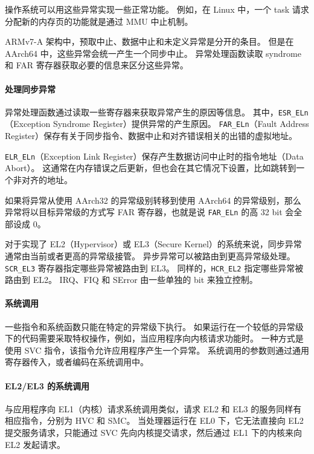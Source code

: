操作系统可以用这些异常实现一些正常功能。
例如，在 Linux 中，一个 task 请求分配新的内存页的功能就是通过 MMU 中止机制。

ARMv7-A 架构中，预取中止、数据中止和未定义异常是分开的条目。
但是在 AArch64 中，这些异常会统一产生一个同步中止。
异常处理函数读取 syndrome 和 FAR 寄存器获取必要的信息来区分这些异常。

\paragraph*{处理同步异常}

异常处理函数通过读取一些寄存器来获取异常产生的原因等信息。
其中，\lstinline!ESR_ELn!（Exception Syndrome Register）提供异常的产生原因。
\lstinline!FAR_ELn!（Fault Address Register）保存有关于同步指令、数据中止和对齐错误相关的出错的虚拟地址。

\lstinline!ELR_ELn!（Exception Link Register）保存产生数据访问中止时的指令地址（Data Abort）。
这通常在内存错误之后更新，但也会在其它情况下设置，比如跳转到一个非对齐的地址。

如果将异常从使用 AArch32 的异常级别转移到使用 AArch64 的异常级别，那么异常将以目标异常级的方式写 FAR 寄存器，也就是说 \lstinline!FAR_ELn! 的高 32 bit 会全部设成 0。

对于实现了 EL2（Hypervisor）或 EL3（Secure Kernel）的系统来说，同步异常通常由当前或者更高的异常级接管。
异步异常可以被路由到更高异常级处理。
\lstinline!SCR_EL3! 寄存器指定哪些异常被路由到 EL3。
同样的，\lstinline!HCR_EL2! 指定哪些异常被路由到 EL2。
IRQ、FIQ 和 SError 由一些单独的 bit 来独立控制。

\paragraph*{系统调用}

一些指令和系统函数只能在特定的异常级下执行。
如果运行在一个较低的异常级下的代码需要采取特权操作，例如，当应用程序向内核请求功能时。
一种方式是使用 SVC 指令，该指令允许应用程序产生一个异常。
系统调用的参数则通过通用寄存器传入，或者编码在系统调用中。

\paragraph*{EL2/EL3 的系统调用}

与应用程序向 EL1（内核）请求系统调用类似，请求 EL2 和 EL3 的服务同样有相应指令，分别为 HVC 和 SMC。
当处理器运行在 EL0 下，它无法直接向 EL2 提交服务请求，只能通过 SVC 先向内核提交请求，然后通过 EL1 下的内核来向 EL2 发起请求。

